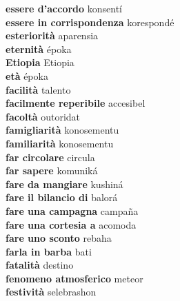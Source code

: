 \textbf{ essere d’accordo  } konsentí \\
\textbf{ essere in corrispondenza  } korespondé \\
\textbf{ esteriorità  } aparensia \\
\textbf{ eternità  } époka \\
\textbf{ Etiopia  } Etiopia \\
\textbf{ età  } époka \\
\textbf{ facilità  } talento \\
\textbf{ facilmente reperibile  } accesibel \\
\textbf{ facoltà  } outoridat \\
\textbf{ famigliarità  } konosementu \\
\textbf{ familiarità  } konosementu \\
\textbf{ far circolare  } circula \\
\textbf{ far sapere  } komuniká \\
\textbf{ fare da mangiare  } kushiná \\
\textbf{ fare il bilancio di  } balorá \\
\textbf{ fare una campagna  } campaña \\
\textbf{ fare una cortesia a  } acomoda \\
\textbf{ fare uno sconto  } rebaha \\
\textbf{ farla in barba  } bati \\
\textbf{ fatalità  } destino \\
\textbf{ fenomeno atmosferico  } meteor \\
\textbf{ festività  } selebrashon \\
